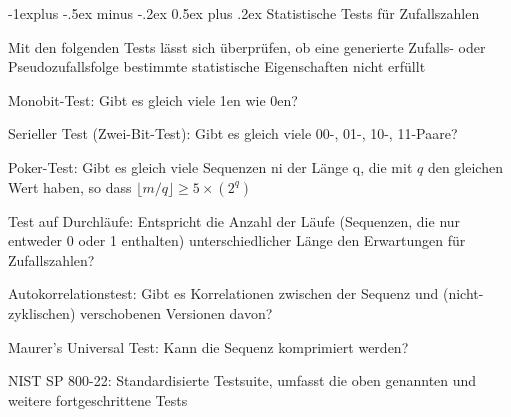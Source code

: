 \documentclass[a4paper]{article}
\makeatletter
\renewcommand{\subsection}{\@startsection{subsection}{2}{0mm}%
 {-1explus -.5ex minus -.2ex}%
 {0.5ex plus .2ex}%
 {\normalfont\normalsize\bfseries}}
\makeatother
\begin{document}
\begin{multicols}{3}
      \subsection{Statistische Tests für Zufallszahlen}
      \begin{itemize*}
            \item Mit den folgenden Tests lässt sich überprüfen, ob eine generierte Zufalls- oder Pseudozufallsfolge bestimmte statistische Eigenschaften nicht erfüllt
            \item Monobit-Test: Gibt es gleich viele 1en wie 0en?
            \item Serieller Test (Zwei-Bit-Test): Gibt es gleich viele 00-, 01-, 10-, 11-Paare?
            \item Poker-Test: Gibt es gleich viele Sequenzen ni der Länge q, die mit $q$ den gleichen Wert haben, so dass $\lfloor m/q\rfloor\geq 5\times (2^q)$
            \item Test auf Durchläufe: Entspricht die Anzahl der Läufe (Sequenzen, die nur entweder 0 oder 1 enthalten) unterschiedlicher Länge den Erwartungen für Zufallszahlen?
            \item Autokorrelationstest: Gibt es Korrelationen zwischen der Sequenz und (nicht-zyklischen) verschobenen Versionen davon?
            \item Maurer's Universal Test: Kann die Sequenz komprimiert werden?
            \item NIST SP 800-22: Standardisierte Testsuite, umfasst die oben genannten und weitere fortgeschrittene Tests
      \end{itemize*}


\end{multicols}
\end{document}
